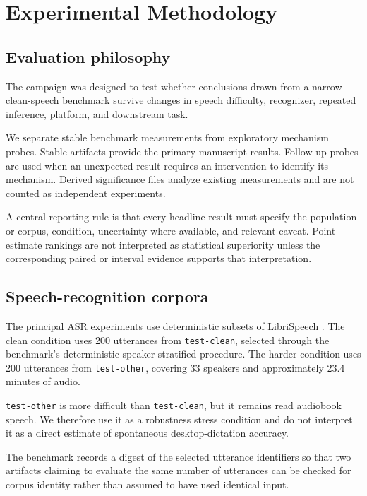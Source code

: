 \section{Experimental Methodology}
\label{sec:method}

\subsection{Evaluation philosophy}

The campaign was designed to test whether conclusions drawn from a narrow clean-speech benchmark
survive changes in speech difficulty, recognizer, repeated inference, platform, and downstream
task.

We separate stable benchmark measurements from exploratory mechanism probes. Stable artifacts
provide the primary manuscript results. Follow-up probes are used when an unexpected result
requires an intervention to identify its mechanism. Derived significance files analyze existing
measurements and are not counted as independent experiments.

A central reporting rule is that every headline result must specify the population or corpus,
condition, uncertainty where available, and relevant caveat. Point-estimate rankings are not
interpreted as statistical superiority unless the corresponding paired or interval evidence
supports that interpretation.

\subsection{Speech-recognition corpora}

The principal ASR experiments use deterministic subsets of LibriSpeech
\citep{panayotov2015librispeech}. The clean condition uses 200 utterances from
\texttt{test-clean}, selected through the benchmark's deterministic speaker-stratified
procedure. The harder condition uses 200 utterances from \texttt{test-other}, covering 33
speakers and approximately 23.4 minutes of audio.

\texttt{test-other} is more difficult than \texttt{test-clean}, but it remains read audiobook
speech. We therefore use it as a robustness stress condition and do not interpret it as a direct
estimate of spontaneous desktop-dictation accuracy.

The benchmark records a digest of the selected utterance identifiers so that two artifacts
claiming to evaluate the same number of utterances can be checked for corpus identity rather than
assumed to have used identical input.

